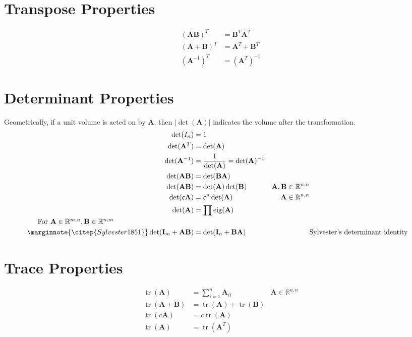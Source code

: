 \documentclass{book}
\newcommand{\mA}{\mathbf{A}}
\newcommand{\mB}{\mathbf{B}}
\newcommand{\mI}{\mathbf{I}}
\DeclareMathOperator{\eig}{eig}
\DeclareMathOperator{\trace}{tr}
\newcommand{\sRnm}{\mathbb{R}^{n,m}}
\newcommand{\sRmn}{\mathbb{R}^{m,n}}
\newcommand{\sRnn}{\mathbb{R}^{n,n}}
\newcommand{\eqcite}[1]{\marginnote{\citep{#1}}}
\begin{document}



\tableofcontents















\chapter{Transpose Properties}

\begin{align}
(\mA\mB)^T   &= \mB^T\mA^T    \\
(\mA+\mB)^T  &= \mA^T+\mB^T   \\
(\mA^{-1})^T &= (\mA^T)^{-1}
\end{align}


\chapter{Determinant Properties}

Geometrically, if a unit volume is acted on by $\mA$, then $|\det(\mA)|$ indicates the volume after the transformation.
\begin{align}
\det(I_n)          &= 1                                   \\
\det(\mA^T)        &= \det(\mA)                           \\
\det(\mA^{-1})     &= \frac{1}{\det(\mA)}=\det(\mA)^{-1}  \\
\det(\mA\mB)       &= \det(\mB\mA)                        \\
\det(\mA\mB)       &= \det(\mA)\det(\mB)                  &\mA,\mB\in\sRnn \\
\det(c\mA)         &= c^n\det(\mA)                        &\mA\in\sRnn     \\
\det(\mA)          &= \prod \eig(\mA)                     \\
\noalign{For $\mA\in\sRmn, \mB\in\sRnm$}
\eqcite{Sylvester1851}
\det(\mI_m+\mA\mB) &= \det(\mI_n+\mB\mA) & & \textrm{Sylvester's determinant identity}
\end{align}


\chapter{Trace Properties}
\begin{align}
\trace(\mA)    &=\sum_{i=1}^n \mA_{ii}   & \mA\in\sRnn \\
\trace(\mA+\mB)&=\trace(\mA)+\trace(\mB) \\
\trace(c\mA)   &=c\trace(\mA)            \\
\trace(\mA)    &=\trace(\mA^T)
\end{align}
\end{document}
